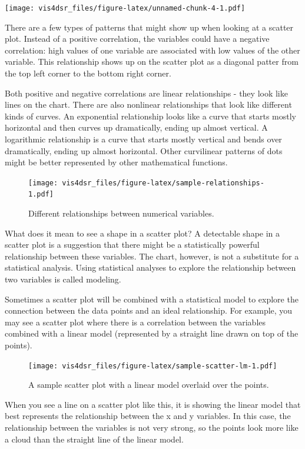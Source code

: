 \documentclass[
]{krantz}
\begin{document}
\texttt{[image: vis4dsr\_files/figure-latex/unnamed-chunk-4-1.pdf]}

There are a few types of patterns that might show up when looking at a scatter plot.
Instead of a positive correlation, the variables could have a negative correlation:
high values of one variable are associated with low values of the other variable. This
relationship shows up on the scatter plot as a diagonal patter from the top left
corner to the bottom right corner.

Both positive and negative correlations are linear relationships - they look like
lines on the chart. There are also nonlinear relationships that look like different
kinds of curves. An exponential relationship looks like a curve that starts
mostly horizontal and then curves up dramatically, ending up almost vertical.
A logarithmic relationship is a curve that starts mostly vertical and bends
over dramatically, ending up almost horizontal. Other curvilinear patterns of dots
might be better represented by other mathematical functions.

\begin{figure}
\centering
\texttt{[image: vis4dsr\_files/figure-latex/sample-relationships-1.pdf]}
\caption{\label{fig:sample-relationships}Different relationships between numerical variables.}
\end{figure}

What does it mean to see a shape in a scatter plot? A detectable shape in a scatter
plot is a suggestion that there might be a statistically powerful relationship
between these variables. The chart, however, is not a substitute for a statistical
analysis. Using statistical analyses to explore the relationship between two variables
is called modeling.

Sometimes a scatter plot will be combined with a statistical model to explore
the connection between the data points and an ideal relationship. For example, you
may see a scatter plot where there is a correlation between the variables
combined with a linear model (represented by a straight line drawn on top of the points).

\begin{figure}
\centering
\texttt{[image: vis4dsr\_files/figure-latex/sample-scatter-lm-1.pdf]}
\caption{\label{fig:sample-scatter-lm}A sample scatter plot with a linear model overlaid over the points.}
\end{figure}

When you see a line on a scatter plot like this, it is showing the linear model
that best represents the relationship between the x and y variables. In this case,
the relationship between the variables is not very strong, so the points look more
like a cloud than the straight line of the linear model.
\end{document}
